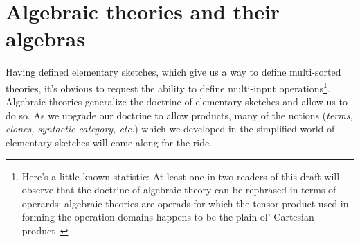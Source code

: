 \documentclass[12pt,twoside]{reedthesis}
\theoremstyle{definition}
\theoremstyle{remark}
\theoremstyle{plain}
\begin{document}

\section{Algebraic theories and their algebras}
Having defined elementary sketches, which give us a way to define multi-sorted
theories, it's obvious to request the ability to define multi-input
operations\footnote{Here's a little known statistic: At least one in two readers
  of this draft will observe that the doctrine of algebraic theory can be
  rephrased in terms of operards: algebraic theories are operads for which the
  tensor product used in forming the operation domains happens to be the plain
  ol' Cartesian product~\cite{TODO: Nlab}}. Algebraic theories generalize the
doctrine of elementary sketches and allow us to do so. As we upgrade our
doctrine to allow products, many of the notions (\emph{terms, clones, syntactic
  category, etc.}) which we developed in the simplified world of elementary
sketches will come along for the ride.
\end{document}
